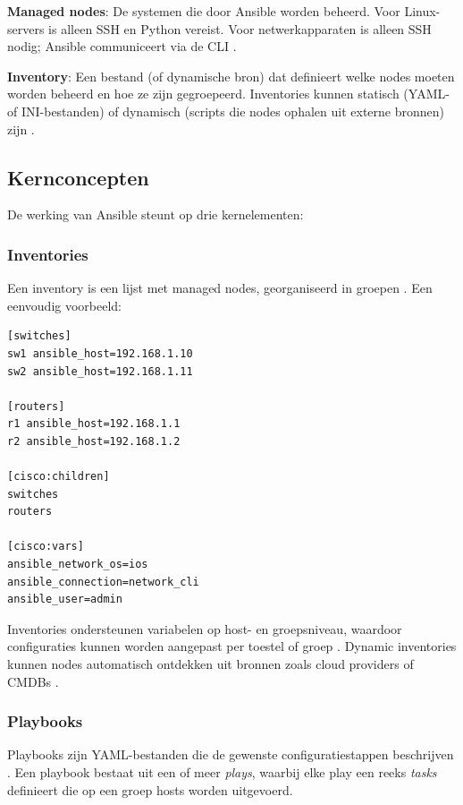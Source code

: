 \textbf{Managed nodes}: De systemen die door Ansible worden beheerd. 
Voor Linux-servers is alleen SSH en Python vereist. 
Voor netwerkapparaten is alleen SSH nodig; Ansible communiceert via de CLI \autocite{AnsibleCommunity2024NetworkModules}.

\textbf{Inventory}: Een bestand (of dynamische bron) dat definieert welke nodes moeten worden beheerd en hoe ze zijn gegroepeerd. 
Inventories kunnen statisch (YAML- of INI-bestanden) of dynamisch (scripts die nodes ophalen uit externe bronnen) zijn \autocite{Hochstein2017AnsibleUpRunning}.

\subsection{Kernconcepten}
\label{subsec:ansible-kernconcepten}

De werking van Ansible steunt op drie kernelementen:

\subsubsection{Inventories}
\label{subsubsec:inventories}

Een inventory is een lijst met managed nodes, georganiseerd in groepen \autocite{RedHat2024AnsibleDocs}. 
Een eenvoudig voorbeeld:

\begin{verbatim}
[switches]
sw1 ansible_host=192.168.1.10
sw2 ansible_host=192.168.1.11

[routers]
r1 ansible_host=192.168.1.1
r2 ansible_host=192.168.1.2

[cisco:children]
switches
routers

[cisco:vars]
ansible_network_os=ios
ansible_connection=network_cli
ansible_user=admin
\end{verbatim}

Inventories ondersteunen variabelen op host- en groepsniveau, waardoor configuraties kunnen worden aangepast per toestel of groep \autocite{Hochstein2017AnsibleUpRunning}.
Dynamic inventories kunnen nodes automatisch ontdekken uit bronnen zoals cloud providers of CMDBs \autocite{Geerling2020AnsibleDevOps}.

\subsubsection{Playbooks}
\label{subsubsec:playbooks}

Playbooks zijn YAML-bestanden die de gewenste configuratiestappen beschrijven \autocite{RedHat2024AnsibleDocs}. 
Een playbook bestaat uit een of meer \emph{plays}, waarbij elke play een reeks \emph{tasks} definieert die op een groep hosts worden uitgevoerd.

